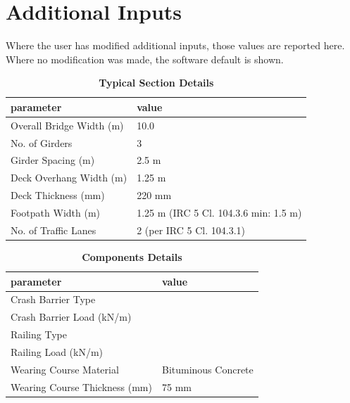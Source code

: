 \documentclass[12pt,a4paper]{report}
\numberwithin{table}{chapter}
\numberwithin{figure}{chapter}
\begin{document}
\newpage
\section{Additional Inputs}
\label{sec:additional-inputs}

Where the user has modified additional inputs, those values are reported here. Where no modification was made, the software default is shown.

\vspace{0.8cm}

\begin{longtable}{|L{5.5cm}|p{10.0cm}|}
\caption{\textbf{Typical Section Details}}
\hline
\textbf{parameter} & \textbf{value} \\
\hline
\textnormal{Overall Bridge Width (m)} & 10.0 \\[6pt]
\hline
\textnormal{No. of Girders} & 3 \\[6pt]
\hline
\textnormal{Girder Spacing (m)} & 2.5 m \\[6pt]
\hline
\textnormal{Deck Overhang Width (m)} & 1.25 m \\[6pt]
\hline
\textnormal{Deck Thickness (mm)} & 220 mm \\[6pt]
\hline
\textnormal{Footpath Width (m)} & 1.25 m (IRC 5 Cl. 104.3.6 min: 1.5 m) \\[6pt]
\hline
\textnormal{No. of Traffic Lanes} & 2 (per IRC 5 Cl. 104.3.1) \\[6pt]
\hline
\end{longtable}

\vspace{0.8em}

\begin{longtable}{|L{5.5cm}|p{10.0cm}|}
\caption{\textbf{Components Details}}
\hline
\textbf{parameter} & \textbf{value} \\
\hline
\textnormal{Crash Barrier Type} &  \\[6pt]
\hline
\textnormal{Crash Barrier Load (kN/m)} &  \\[6pt]
\hline

\textnormal{Railing Type} &  \\[6pt]
\hline
\textnormal{Railing Load (kN/m)} &  \\[6pt]
\hline
\textnormal{Wearing Course Material} & Bituminous Concrete \\[6pt]
\hline
\textnormal{Wearing Course Thickness (mm)} & 75 mm \\[6pt]
\hline
\end{longtable}
\end{document}
